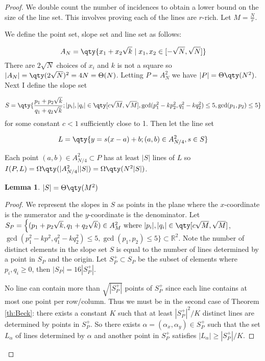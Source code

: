 \documentclass[11pt]{article}
\newtheorem{lemma}[theorem]{Lemma}
\newcommand{\RR}{\ensuremath{\mathbb R}}
\begin{document}
\begin{proof}
We double count the number of incidences to obtain a lower bound on the size of the line set. This involves proving each of the lines are $r$-rich. Let $M=\frac{N}{r}$.

We define the point set, slope set and line set as follows:

\begin{equation*}
    A_N = \qty{ x_1 + x_2 \sqrt{k} \hspace{3pt}|\hspace{3pt} x_1,x_2 \in [-\sqrt{N},\sqrt{N}]}
\end{equation*}
There are $2\sqrt{N}$ choices of $x_i$ and $k$ is not a square so $|A_N| = \qty(2\sqrt{N})^2 = 4N = \Theta(N)$. Letting $P=A_N^2$ we have $|P|=\Theta\qty(N^2)$. Next I define the slope set

\begin{equation*}
    S = \qty{\frac{p_1+p_2\sqrt{k}}{q_1+q_2\sqrt{k}} ;  |p_i|,|q_i| \in \qty[c \sqrt{M},\sqrt{M}] , \gcd(p_1^2-k p_2^2,q_1^2-k q_2^2) \leq 5, \gcd(p_1,p_2) \leq 5}
\end{equation*}
for some constant $c < 1$ sufficiently close to 1. Then let the line set 

\begin{equation*}
    L = \qty{y=s(x-a)+b ; (a,b) \in A_{N/4}^2,s\in S}
\end{equation*}

Each point $(a,b)\in A_{N/4}^2 \subset P$ has at least $|S|$ lines of $L$ so $I(P,L)=\Omega\qty(|A_{N/4}^2| |S|)=\Omega\qty(N^2 |S|)$.

\begin{lemma}\label{th:slopes}
$|S|=\Theta\qty(M^2)$
\end{lemma}

\begin{proof}
We represent the slopes in $S$ as points in the plane where the $x$-coordinate is the numerator and the $y$-coordinate is the denominator. Let $S_P=\Big\{ (p_1+p_2\sqrt{k},q_1+q_2\sqrt{k}) \in A_M^2 \text{ where } |p_i|,|q_i| \in \qty[c \sqrt{M},\sqrt{M}]$, $\gcd(p_1^2-kp^2,q_1^2-kq_2^2) \leq 5, \gcd(p_1,p_2) \leq 5 \Big\} \subset\RR^2$. Note the number of distinct elements in the slope set $S$ is equal to the number of lines determined by a point in $S_P$ and the origin. Let $S_P^+ \subset S_P$ be the subset of elements where $p_i,q_i \geq 0$, then $|S_P|=16|S_P^+|$. 

No line can contain more than $\sqrt{|S_P^+|}$ points of $S_P^+$ since each line contains at most one point per row/column. Thus we must be in the second case of Theorem \ref{th:Beck}: there exists a constant $K$ such that at least $|S_P^+|^2/K$ distinct lines are determined by points in $S_P^+$. So there exists $\alpha=(\alpha_x,\alpha_y) \in S_P^+$ such that the set $L_\alpha$ of lines determined by $\alpha$ and another point in $S_P^+$ satisfies $|L_\alpha| \geq |S_P^+|/K$. 


\end{proof}
\end{proof}
\end{document}
